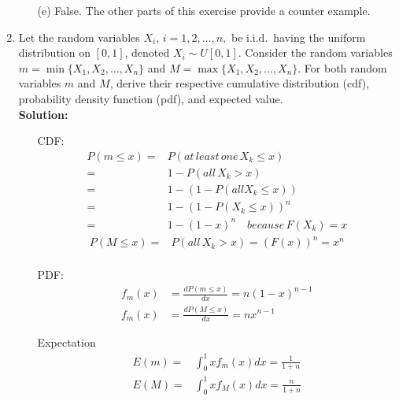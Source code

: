 \documentclass[letterpaper,12pt]{article}
\theoremstyle{definition}
\begin{document}
\begin{enumerate}
\begin{itemize}
			\item[(e)] False. The other parts of this exercise provide a counter example.
\end{itemize}
	\item Let the random variables $X_i$, $i=1,2,\ldots,n,$ be i.i.d.\ having the uniform distribution on $[0,1]$, denoted $X_i \sim U[0,1]$. Consider the random variables $m=\min\{X_1,X_2,\ldots,X_n\}$ and $M=\max\{X_1,X_2,\ldots,X_n\}$. For both random variables $m$ and $M$, derive their respective cumulative distribution (cdf), probability density function (pdf), and expected value.\\
	\textbf{Solution:}
	\begin{itemize}
	\item[CDF:]\begin{align*}
	P(m \leq x) =& P(at\, least\, one\, X_k \leq x)\\
	=& 1 - P(all\,X_k > x )\\
	=& 1- (1-P(all X_k \leq x))\\
	=& 1-(1-P(X_k \leq x))^n\\
	=&1-(1-x)^n \quad because \, F(X_k)=x
	\end{align*}
	\begin{align*}
	P(M \leq x) =& P(all\,X_k > x )
	= (F(x))^n = x^n\\
	\end{align*}
	\item[PDF:]
	\begin{align*}
	f_m(x) &= \frac{dP(m \leq x)}{dx} = n(1-x)^{n-1}\\
	f_m(x) &= \frac{dP(M \leq x)}{dx} = nx^{n-1}
	\end{align*}
	\item[Expectation]
		\begin{align*}
	E(m) =& \int_0^1 xf_m(x) dx = \frac{1}{1+n}\\
	E(M) =& \int_0^1 xf_M(x) dx = \frac{n}{1+n}
	\end{align*}
	\end{itemize}


\end{enumerate}
\end{document}
